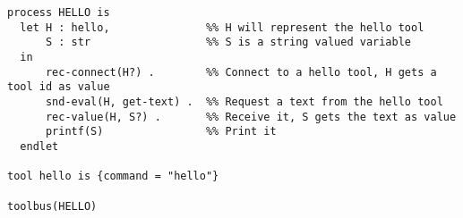 \small
\begin{verbatim}
process HELLO is
  let H : hello,               %% H will represent the hello tool
      S : str                  %% S is a string valued variable
  in
      rec-connect(H?) .        %% Connect to a hello tool, H gets a tool id as value
      snd-eval(H, get-text) .  %% Request a text from the hello tool
      rec-value(H, S?) .       %% Receive it, S gets the text as value
      printf(S)                %% Print it    
  endlet

tool hello is {command = "hello"}

toolbus(HELLO)
\end{verbatim}
\normalsize
